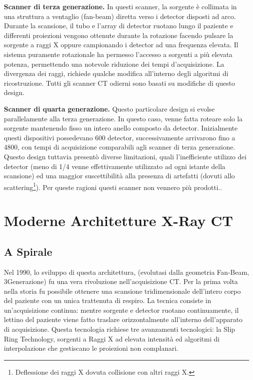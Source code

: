 \documentclass[a4paper,12pt, doubleside]{report}
\begin{document}
                \bigskip
                \par
                    \textbf{Scanner di terza generazione.} In questi scanner, la sorgente è collimata in una struttura a ventaglio (fan-beam) diretta verso i detector disposti ad arco. Durante la scansione, il tubo e l’array di detector ruotano lungo il paziente e differenti proiezioni vengono ottenute durante la rotazione facendo pulsare la sorgente a raggi X oppure campionando i detector ad una frequenza elevata. Il sistema puramente rotazionale ha permesso l’accesso a sorgenti a più elevata potenza, permettendo una notevole riduzione dei tempi d’acquisizione. La divergenza dei raggi, richiede qualche modifica all’interno degli algoritmi di ricostruzione. Tutti gli scanner CT odierni sono basati su modifiche di questo design. 
                            
                \bigskip
                \par
                    \textbf{Scanner di quarta generazione.} Questo particolare design si evolse parallelamente alla terza generazione. In questo caso, venne fatta roteare solo la sorgente mantenendo fisso un intero anello composto da detector. Inizialmente questi dispositivi possedevano 600 detector, successivamente arrivarono fino a 4800, con tempi di acquisizione comparabili agli scanner di terza generazione. Questo design tuttavia presentò diverse limitazioni, quali l’inefficiente utilizzo dei detector (meno di 1/4 venne effettivamente utilizzato ad ogni istante della scansione) ed una maggior suscettibilità alla presenza di artefatti (dovuti allo scattering\footnote{Deflessione dei raggi X dovuta collisione con altri raggi X.}). Per queste ragioni questi scanner non vennero più prodotti..
                            
        \section{Moderne Architetture X-Ray CT}
            \subsection{A Spirale}
                \par
                    Nel 1990, lo sviluppo di questa architettura, (evolutasi dalla geometria Fan-Beam, 3\degree Generazione) fu una vera rivoluzione nell'acquisizione CT. Per la prima volta nella storia fu possibile ottenere una scansione tridimensionale dell'intero corpo del paziente con un unica trattenuta di respiro.
                    La tecnica consiste in un'acquisizione continua: mentre sorgente e detector ruotano continuamente, il lettino del paziente viene fatto traslare orizzontalmente all'interno dell'apparato di acquisizione. Questa tecnologia richiese tre avanzamenti tecnologici: la Slip Ring Technology, sorgenti a Raggi X ad elevata intensità ed algoritmi di interpolazione che gestiscano le proiezioni non complanari.
                    
\end{document}
